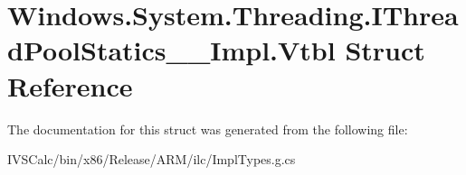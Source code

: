 \hypertarget{struct_windows_1_1_system_1_1_threading_1_1_i_thread_pool_statics_____impl_1_1_vtbl}{}\section{Windows.\+System.\+Threading.\+I\+Thread\+Pool\+Statics\+\_\+\+\_\+\+Impl.\+Vtbl Struct Reference}
\label{struct_windows_1_1_system_1_1_threading_1_1_i_thread_pool_statics_____impl_1_1_vtbl}


The documentation for this struct was generated from the following file\+:\begin{DoxyCompactItemize}
\item 
I\+V\+S\+Calc/bin/x86/\+Release/\+A\+R\+M/ilc/Impl\+Types.\+g.\+cs\end{DoxyCompactItemize}
